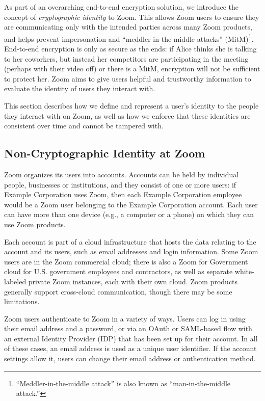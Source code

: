 \label{sec:identitykeymanagement}
As part of an overarching end-to-end encryption solution, we introduce the concept of
\textit{cryptographic identity} to Zoom. This allows Zoom users to ensure they are communicating
only with the intended parties across many Zoom products, and helps prevent impersonation and
``meddler-in-the-middle attacks'' (MitM)\footnote{``Meddler-in-the-middle attack'' is also known as
``man-in-the-middle attack.''}. End-to-end encryption is only as secure as the ends: if Alice thinks
she is talking to her coworkers, but instead her competitors are participating in the meeting
(perhaps with their video off) or there is a MitM, encryption will not be sufficient to protect her.
Zoom aims to give users helpful and trustworthy information to evaluate the identity of users they
interact with.

This section describes how we define and represent a user's identity to the people they interact
with on Zoom, as well as how we enforce that these identities are consistent over time and cannot be
tampered with.

\subsection{Non-Cryptographic Identity at Zoom}

Zoom organizes its users into accounts. Accounts can be held by individual people, businesses or
institutions, and they consist of one or more users: if Example Corporation uses Zoom, then each
Example Corporation employee would be a Zoom user belonging to the Example Corporation account. Each
user can have more than one device (e.g., a computer or a phone) on which they can use Zoom
products.

Each account is part of a cloud infrastructure that hosts the data relating to the account and its
users, such as email addresses and login information. Some Zoom users are in the Zoom commercial
cloud; there is also a Zoom for Government cloud for U.S. government employees and contractors, as
well as separate white-labeled private Zoom instances, each with their own cloud. Zoom products
generally support cross-cloud communication, though there may be some limitations.

Zoom users authenticate to Zoom in a variety of ways. Users can log in using their email address and
a password, or via an OAuth or SAML-based flow with an external Identity Provider (IDP) that has
been set up for their account. In all of these cases, an email address is used as a unique user
identifier. If the account settings allow it, users can change their email address or authentication
method.

